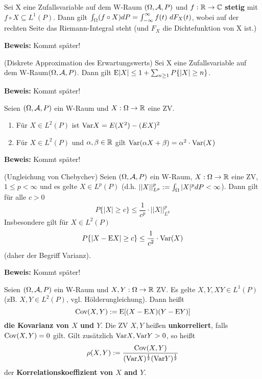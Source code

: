 \documentclass[parskip = full, 12pt]{scrartcl}
\begin{document}
\label{ss: Satz 4.9}
	Sei X eine Zufallsvariable auf dem W-Raum $(\Omega, \mathcal{A}, P)$ und $f:\mathbb{R}
	\rightarrow \mathbb{C}$ \textbf{stetig} mit $f \circ X \subseteq L^1(P)$. Dann gilt
	$\int_\Omega (f \circ X) dP = \int_{-\infty}^{\infty} f(t)\ dF_X(t)$, wobei auf
	der rechten Seite das Riemann-Integral steht (und $F_X$ die Dichtefunktion
	von X ist.)

	\textbf{Beweis:} Kommt später!

\label{ss: Satz 4.10}
	(Diskrete Approximation des Erwartungswerts) Sei X eine Zufallsvariable auf
	dem W-Raum$(\Omega, \mathcal{A}, P)$. Dann gilt $\textrm{E} |X| \leq 1 + \sum_{n \geq 1} P\{ 
	|X| \geq n \}$.

	\textbf{Beweis:} Kommt später!

\label{ss: Lemma 4.11}
	Seien $(\Omega, \mathcal{A}, P)$ ein W-Raum und $X: \Omega \rightarrow \mathbb{R}$ eine ZV.
	\begin{enumerate}
		\item Für $X \in L^2(P)$ ist $\textrm{Var} X = E(X^2) - (EX)^2$
		\item Für $X \in L^2(P)$ und $\alpha, \beta \in \mathbb{R}$ gilt $\textrm{Var}(\alpha X
			+ \beta) = \alpha^2 \cdot \textrm{Var}(X)$
	\end{enumerate}

	\textbf{Beweis:} Kommt später!

\label{ss: Satz 4.12}
	(Ungleichung von Chebychev) Seien $(\Omega, \mathcal{A}, P)$ ein W-Raum, $X: \Omega 
	\rightarrow \mathbb{R}$ eine ZV, $1 \leq p < \infty$ und es gelte $X \in L^p(P)$ 
	(d.h. $||X||_{L^p}^p := \int_\Omega |X|^p dP < \infty$). Dann gilt für alle $c 
	> 0$ 
	$$P\{ |X| \geq c \} \leq \frac{1}{c^p} \cdot ||X||_{L^p}^p$$ 
	Insbesondere gilt für $X \in L^2(P)$
	$$ P\{ |X - \textrm{E} X| \geq c \} \leq \frac{1}{c^2} \cdot \textrm{Var} (X)$$
	(daher der Begriff Varianz).

	\textbf{Beweis:} Kommt später!

\label{ss: Definition 4.13}
	Seien $(\Omega, \mathcal{A}, P)$ ein W-Raum und $X, Y: \Omega \rightarrow \mathbb{R}$ ZV. Es 
	gelte $X, Y, XY \in L^1(P)$ (zB. $X, Y \in L^2(P)$, vgl. Hölderungleichung).
	Dann heißt $$\textrm{Cov}(X, Y) := \textrm{E} [(X - \textrm{E} X) (Y - \textrm{E} Y)]$$ \textbf{die Kovarianz
	von $X$ und $Y$}. Die ZV $X, Y$ heißen \textbf{unkorreliert}, falls $\textrm{Cov}(X,Y)
	= 0 $ gilt. Gilt zusätzlich $\textrm{Var} X, \textrm{Var} Y > 0$, so heißt $$\rho(X,Y) :=
	\frac{\textrm{Cov}(X,Y)}{(\textrm{Var} X)^{\frac{1}{2}} (\textrm{Var} Y)^{\frac{1}{2}}}$$ der \textbf{
	Korrelationskoeffizient von $X$ and $Y$}.
\end{document}
